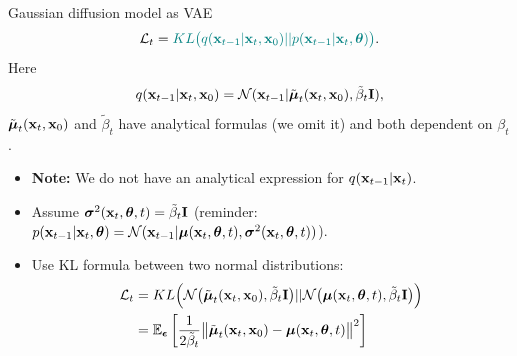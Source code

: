 \begin{frame}{Gaussian diffusion model as VAE}
	\[
		\mathcal{L}_t = {\color{teal}KL \bigl(q(\mathbf{x}_{t-1} | \mathbf{x}_t, \mathbf{x}_0) || p(\mathbf{x}_{t - 1} | \mathbf{x}_t, \boldsymbol{\theta} )\bigr)}.
	\]
	Here
	\[
		q(\mathbf{x}_{t-1} | \mathbf{x}_t, \mathbf{x}_0) = \mathcal{N}(\mathbf{x}_{t-1} | \tilde{\boldsymbol{\mu}}_t(\mathbf{x}_t, \mathbf{x}_0), \tilde{\beta}_t \mathbf{I}),
	\]
	$\tilde{\boldsymbol{\mu}}_t(\mathbf{x}_t, \mathbf{x}_0)$ and $\tilde{\beta}_t$ have analytical formulas (we omit it) and both dependent on $\beta_t$.
	\begin{itemize}
		\item \textbf{Note:} We do not have an analytical expression for $q(\mathbf{x}_{t-1} | \mathbf{x}_t)$.
		\item Assume $\boldsymbol{\sigma}^2(\mathbf{x}_t, \boldsymbol{\theta}, t) = \tilde{\beta}_t \mathbf{I}$ {\color{gray}(reminder: $p(\mathbf{x}_{t - 1} | \mathbf{x}_t, \boldsymbol{\theta}) = \mathcal{N}(\mathbf{x}_{t - 1} | \boldsymbol{\mu}(\mathbf{x}_t, \boldsymbol{\theta}, t), \boldsymbol{\sigma}^2(\mathbf{x}_t, \boldsymbol{\theta}, t))$)}.
		\item Use KL formula between two normal distributions:
		\begin{align*}
			\mathcal{L}_t &= KL\Bigl(\mathcal{N}\bigl(\tilde{\boldsymbol{\mu}}_t(\mathbf{x}_t, \mathbf{x}_0), \tilde{\beta}_t \mathbf{I} \bigr) || \mathcal{N}\bigl(\boldsymbol{\mu}(\mathbf{x}_t, \boldsymbol{\theta}, t), \tilde{\beta}_t \mathbf{I}\bigr)\Bigr) \\ 
			&= \mathbb{E}_{\boldsymbol{\epsilon}} \left[ \frac{1}{2\tilde{\beta}_t} \bigl\| \tilde{\boldsymbol{\mu}}_t(\mathbf{x}_t, \mathbf{x}_0) - \boldsymbol{\mu}(\mathbf{x}_t, \boldsymbol{\theta}, t) \bigr\|^2 \right]
		\end{align*}
	\end{itemize}
	\end{frame}
